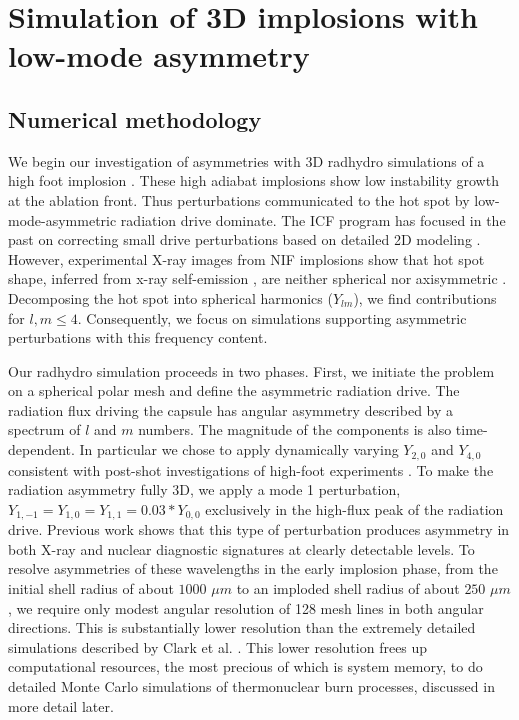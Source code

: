 \documentclass[aip,pop,numerical,reprint,floatfix]{revtex4-1}
\begin{document}
\section{\label{sec:3d_sims}Simulation of 3D implosions with low-mode asymmetry }


\subsection{\label{sec:numerical}Numerical methodology}

We begin our investigation of asymmetries with 3D radhydro simulations
of a high foot implosion \cite{dittrich_highfoot_prl}. These high adiabat implosions
show low instability growth at the ablation front. Thus perturbations
communicated to the hot spot by low-mode-asymmetric radiation drive
dominate. The ICF program has focused in the past on correcting small
drive perturbations based on detailed 2D modeling \cite{landen_tuning}. However, experimental X-ray images from NIF
implosions show that hot spot shape, inferred from x-ray self-emission
\cite{kyrala_nif_symmetry_2010}, are neither spherical nor axisymmetric \cite{peterson_lpi_3d}.
Decomposing the hot spot into spherical harmonics ($Y_{lm}$), we
find contributions for $l,m\leq4$. Consequently, we focus on simulations
supporting asymmetric perturbations with this frequency content.

Our radhydro simulation proceeds in two phases. First, we initiate
the problem on a spherical polar mesh and define the asymmetric radiation
drive. The radiation flux driving the capsule has angular asymmetry
described by a spectrum of $l$ and $m$ numbers. The magnitude of
the components is also time-dependent. In particular we chose to apply
dynamically varying $Y_{2,0}$ and $Y_{4,0}$ consistent with post-shot
investigations of high-foot experiments \cite{kritcher_dynamic_p2p4}. To make the radiation asymmetry fully 3D, we apply
a mode 1 perturbation, $Y_{1,-1}=Y_{1,0}=Y_{1,1}=0.03*Y_{0,0}$ exclusively
in the high-flux peak of the radiation drive. Previous work \cite{spears_mode1_pop_140409}
shows that this type of perturbation produces asymmetry in both X-ray
and nuclear diagnostic signatures at clearly detectable levels. To
resolve asymmetries of these wavelengths in the early implosion phase,
from the initial shell radius of about $1000$ $\mu m$ to an imploded
shell radius of about $250$ $\mu m$, we require only modest angular
resolution of 128 mesh lines in both angular directions. This is substantially
lower resolution than the extremely detailed simulations described
by Clark et al. \cite{clark_detailed_postshot_pop2012}. This lower
resolution frees up computational resources, the most precious of
which is system memory, to do detailed Monte Carlo simulations of
thermonuclear burn processes, discussed in more detail later.
\end{document}
